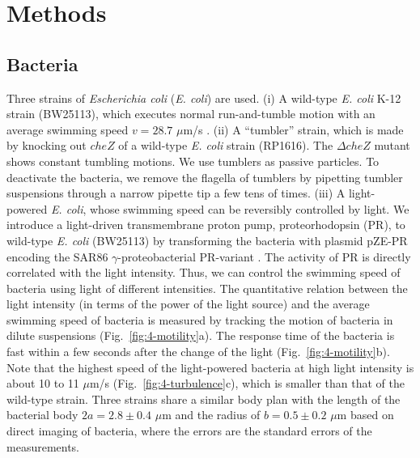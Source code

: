 \section{Methods}

\subsection{Bacteria}
Three strains of \textit{Escherichia coli} (\textit{E. coli}) are used. (i) A wild-type \textit{E. coli} K-12 strain (BW25113), which executes normal run-and-tumble motion with an average swimming speed $v = 28.7$ $\mu$m/s \cite{Berg2004}. (ii) A ``tumbler'' strain, which is made by knocking out $cheZ$ of a wild-type \textit{E. coli} strain (RP1616). The $\Delta cheZ$ mutant shows constant tumbling motions. We use tumblers as passive particles. To deactivate the bacteria, we remove the flagella of tumblers by pipetting tumbler suspensions through a narrow pipette tip a few tens of times. (iii) A light-powered \textit{E. coli}, whose swimming speed can be reversibly controlled by light. We introduce a light-driven transmembrane proton pump, proteorhodopsin (PR), to wild-type \textit{E. coli} (BW25113) by transforming the bacteria with plasmid pZE-PR encoding the SAR86 $\gamma$-proteobacterial PR-variant \cite{Walter2007}. The activity of PR is directly correlated with the light intensity. Thus, we can control the swimming speed of bacteria using light of different intensities.
The quantitative relation between the light intensity (in terms of the power of the light source) and the average swimming speed of bacteria is measured by tracking the motion of bacteria in dilute suspensions (Fig.~\ref{fig:4-motility}a).
The response time of the bacteria is fast within a few seconds after the change of the light (Fig.~\ref{fig:4-motility}b).
Note that the highest speed of the light-powered bacteria at high light intensity is about 10 to 11 $\mu$m/s (Fig.~\ref{fig:4-turbulence}c), which is smaller than that of the wild-type strain.
Three strains share a similar body plan with the length of the bacterial body $2a = 2.8 \pm 0.4$ $\mu$m and the radius of $b = 0.5 \pm 0.2$ $\mu$m based on direct imaging of bacteria, where the errors are the standard errors of the measurements.

